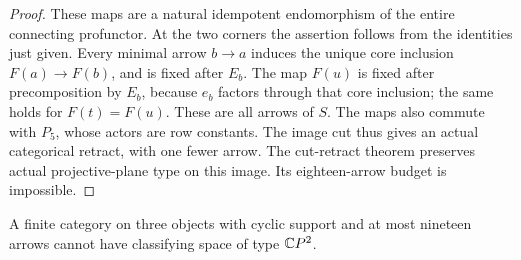 \begin{proof}
These maps are a natural idempotent endomorphism of the entire
connecting profunctor. At the two corners the assertion follows
from the identities just given. Every minimal arrow $b\to a$
induces the unique core inclusion $F(a)\to F(b)$, and is fixed
after $E_b$. The map $F(u)$ is fixed after precomposition by
$E_b$, because $e_b$ factors through that core inclusion; the
same holds for $F(t)=F(u)$. These are all arrows of $S$.
The maps also commute with $P_5$, whose actors are row constants.
The image cut thus gives an actual categorical retract, with one
fewer arrow. The cut-retract theorem preserves actual projective-plane
type on this image. Its eighteen-arrow budget is impossible.
\end{proof}

\begin{theorem}
\label{CP2:A-strong-three-nineteen}
A finite category on three objects with cyclic support and at
most nineteen arrows cannot have classifying space of type $\mathbb{C}P^2$.
\end{theorem}
